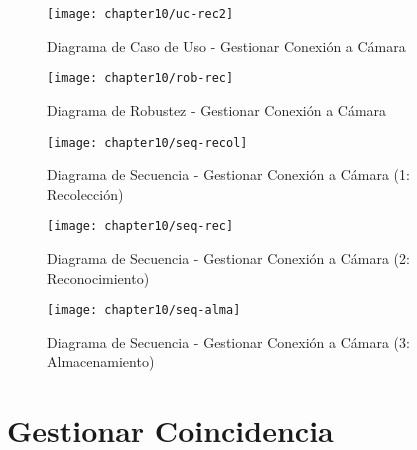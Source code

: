     \begin{figure}[H]
        \centering
        \texttt{[image: chapter10/uc-rec2]}
        \caption{Diagrama de Caso de Uso - Gestionar Conexión a Cámara}
        \label{fig:uc-rec}
    \end{figure}
    \begin{landscape}
        
    \begin{figure}[H]
        \centering
        \texttt{[image: chapter10/rob-rec]}
        \caption{ Diagrama de Robustez - Gestionar Conexión a Cámara}
        \label{fig:rob-rec}
    \end{figure}
    
 \begin{figure}[H]
        \centering
        \texttt{[image: chapter10/seq-recol]}
        \caption{Diagrama de Secuencia - Gestionar Conexión a Cámara (1: Recolección)}
        \label{fig:seq-recol}
    \end{figure}
    
    \begin{figure}[H]
        \centering
        \texttt{[image: chapter10/seq-rec]}
        \caption{Diagrama de Secuencia - Gestionar Conexión a Cámara (2: Reconocimiento)  }
        \label{fig:seq-rec}
    \end{figure}
    
    \begin{figure}[H]
        \centering
        \texttt{[image: chapter10/seq-alma]}
        \caption{Diagrama de Secuencia - Gestionar Conexión a Cámara (3: Almacenamiento)  }
        \label{fig:seq-alma}
    \end{figure}
    \end{landscape}    
    
\section{Gestionar Coincidencia}

